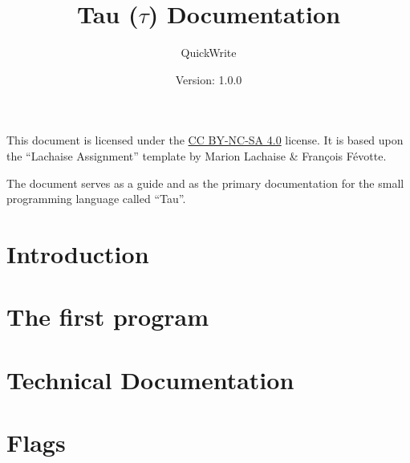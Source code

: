 \documentclass[a4paper]{article}
\title{Tau ($\tau$) Documentation} %
\author{QuickWrite} %
\date{Version: 1.0.0} %
\newcommand{\importsection}[2]{\newpage
\section{#2}
}
\begin{document}
\maketitle %

This document is licensed under the \href{https://creativecommons.org/licenses/by-nc-sa/4.0/}{CC BY-NC-SA 4.0} license. 
It is based upon the ``Lachaise Assignment'' template by Marion Lachaise \& François Févotte.

The document serves as a guide and as the primary documentation for the small programming language called ``Tau''.

\tableofcontents

\importsection{sections/introduction}{Introduction}

\importsection{sections/first-program}{The first program}

\importsection{sections/technical-documentation}{Technical Documentation}

\importsection{sections/flags}{Flags}
\end{document}
